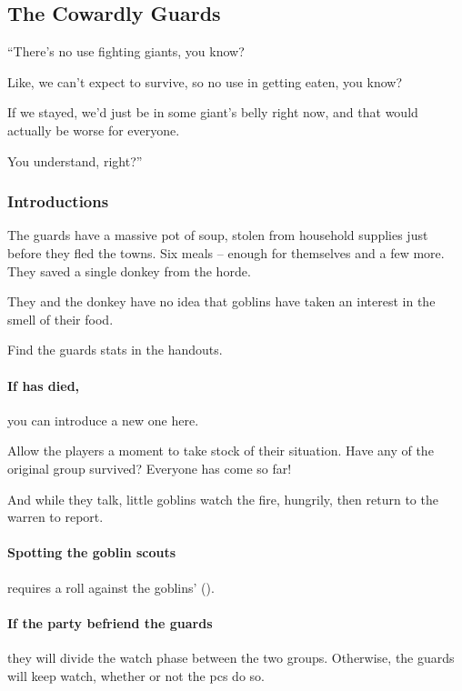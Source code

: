 \begin{multicols}{2}
\subsection{The Cowardly Guards}

\begin{speechtext}
  ``There's no use fighting giants, you know?

  Like, we can't expect to survive, so no use in getting eaten, you know?

  If we stayed, we'd just be in some giant's belly right now, and that would actually be worse for everyone.

  You understand, right?''
\end{speechtext}

\subsubsection{Introductions}

The \glspl{guard} have a massive pot of soup, stolen from household supplies just before they fled the towns.
Six meals -- enough for themselves and a few more.
They saved a single donkey from the horde.


They and the donkey have no idea that goblins have taken an interest in the smell of their food.

Find the \glspl{guard} stats in the handouts.

\paragraph{If  has died,}
you can introduce a new one here.

Allow the players a moment to take stock of their situation.
Have any of the original group survived?
Everyone has come so far!

And while they talk, little goblins watch the fire, hungrily, then return to the warren to report.


\paragraph{Spotting the goblin scouts}
requires a  roll against the goblins'  (\tn).

\paragraph{If the party befriend the \glspl{guard}}
they will divide the watch phase between the two groups.
Otherwise, the \glspl{guard} will keep watch, whether or not the \glspl{pc} do so.


\end{multicols}
